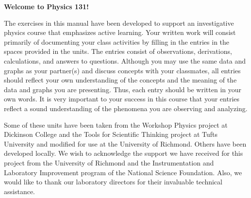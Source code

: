\maketitle

\vspace{0.8 in}


\begin{center}
\large{\textbf{Welcome to Physics 131!}}
\end{center}

The exercises in this manual have been developed to support an investigative
physics course that emphasizes active learning. 
Your written work will consist primarily of documenting
your class activities by filling in the entries in the spaces provided
in the units. The entries consist of observations, derivations, calculations,
and answers to questions. Although you may use the same data and graphs
as your partner(s) and discuss concepts with your classmates, all
entries should reflect your own understanding of the concepts and
the meaning of the data and graphs you are presenting. Thus, each
entry should be written in your own words. It is very important
to your success in this course that your entries reflect a sound understanding
of the phenomena you are observing and analyzing. 

Some of these units
have been taken from the Workshop Physics project at Dickinson College
and the Tools for Scientific Thinking project at Tufts University
and modified for use at the University of Richmond. Others have been
developed locally. 
We wish to acknowledge the support we have received for this project
from the University of Richmond and the Instrumentation and Laboratory
Improvement program of the National Science Foundation. Also, we would
like to thank our laboratory directors for their invaluable technical
assistance.


\thispagestyle{plain}


\
\setcounter{page}{2} %

